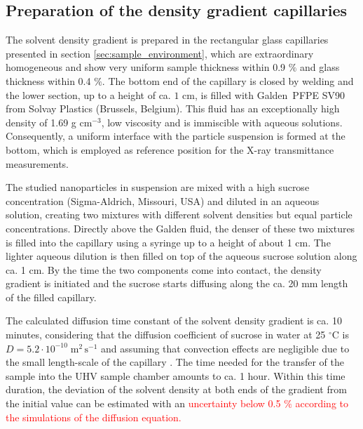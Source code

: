 \subsection{Preparation of the density gradient capillaries}
\label{sec:GradientPreparation}
The solvent density gradient is prepared in the rectangular glass capillaries presented in section \ref{sec:sample_environment}, which are extraordinary homogeneous and show very uniform sample thickness within 0.9 $\%$ and glass thickness within 0.4 $\%$. The bottom end of the capillary is closed by welding and the lower section, up to a height of ca. \(1\) cm, is filled with Galden\textregistered\ PFPE SV90 from Solvay Plastics (Brussels, Belgium). This fluid has an exceptionally high density of 1.69 g cm$^{-3}$, low viscosity and is immiscible with aqueous solutions. Consequently, a uniform interface with the particle suspension is formed at the bottom, which is employed as reference position for the X-ray transmittance measurements. 

The studied nanoparticles in suspension are mixed with a high sucrose concentration (Sigma-Aldrich, Missouri, USA) and diluted in an aqueous solution, creating two mixtures with different solvent densities but equal particle concentrations. Directly above the Galden fluid, the denser of these two mixtures is filled into the capillary using a syringe up to a height of about 1 cm. The lighter aqueous dilution is then filled on top of the aqueous sucrose solution along ca. 1 cm. By the time the two components come into contact, the density gradient is initiated and the sucrose starts diffusing along the ca. 20 mm length of the filled capillary.

The calculated diffusion time constant of the solvent density gradient is ca. 10 minutes, considering that the diffusion coefficient of sucrose in water at 25 $^{\circ}$C is $D=5.2 \cdot 10^{-10} \;\mbox{m}^2\,\mbox{s}^{-1}$ \citep{uedaira_sugar-water_1985,ribeiro_binary_2006} and assuming that convection effects are negligible due to the small length-scale of the capillary \citep{berberan-santos_barometric_1997}. The time needed for the transfer of the sample into the UHV sample chamber amounts to ca. 1 hour. Within this time duration, the deviation of the solvent density at both ends of the gradient from the initial value can be estimated with an \textcolor{red}{uncertainty below 0.5 $\%$ according to the simulations of the diffusion equation.}


